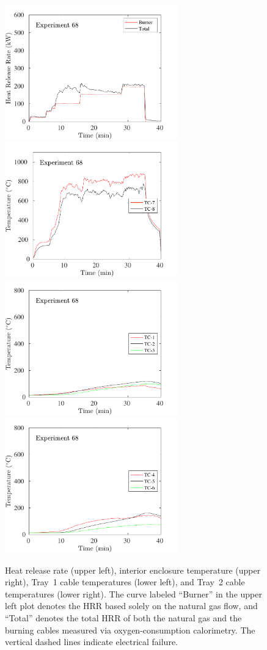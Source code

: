 \begin{figure}[H]
\includegraphics[height=2.30in]{../SCRIPT_FIGURES/Test_68_HRR} \hfill
\includegraphics[height=2.30in]{../SCRIPT_FIGURES/Test_68_TC_7-8} \\
\includegraphics[height=2.30in]{../SCRIPT_FIGURES/Test_68_TC_1-3} \hfill
\includegraphics[height=2.30in]{../SCRIPT_FIGURES/Test_68_TC_4-6}
\caption[HRR and temperatures of Experiment 68]{Heat release rate (upper left), interior enclosure temperature (upper right), Tray~1 cable temperatures (lower left), and Tray~2 cable temperatures (lower right). The curve labeled ``Burner'' in the upper left plot denotes the HRR based solely on the natural gas flow, and ``Total'' denotes the total HRR of both the natural gas and the burning cables measured via oxygen-consumption calorimetry. The vertical dashed lines indicate electrical failure.}
\label{fig:Test_68}
\end{figure}

